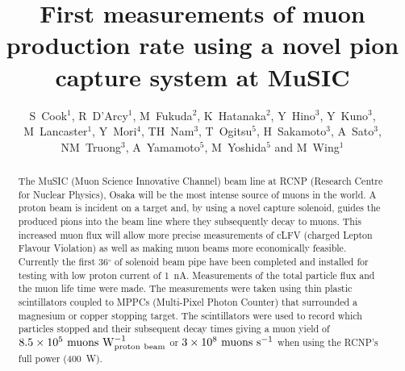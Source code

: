 \documentclass[a4paper]{jpconf}
\begin{document}
\title{First measurements of muon production rate using a novel pion capture system at MuSIC}

\author{S~Cook$^1$, R~D'Arcy$^1$, M~Fukuda$^2$, K~Hatanaka$^2$, Y~Hino$^3$, Y~Kuno$^3$, M~Lancaster$^1$, Y~Mori$^4$, TH~Nam$^3$, T~Ogitsu$^5$, H~Sakamoto$^3$, A~Sato$^3$, NM~Truong$^3$, A~Yamamoto$^5$, M~Yoshida$^5$ and M~Wing$^1$}

\address{$^1$Department of Physics and Astronomy, University College London, Gower Street, London WC1E~6BT, UK}
\address{$^2$Research Centre for Nuclear Physics, 10-1 Mihogaoka, Ibaraki, Osaka~567-0047, Japan}
\address{$^3$Department of Physics, Graduate School of Science, Osaka University, 1-1 Machikane, Toyonaka, Osaka 590-0043 Japan}
\address{$^4$Kyoto Research Reactor Institute, 2 Asashiro-Nishi, Kumatori-cho, Sennangu, Osaka 590-0494, Japan}
\address{$^5$High Energy Accelerator Research Organisation, KEK, 1-1 Oho, Tsukuba, Ibaragi 305-0801, Japan}


\begin{abstract}
The MuSIC (Muon Science Innovative Channel) beam line at RCNP (Research Centre for Nuclear Physics), Osaka will be the most intense source of muons in the world. A proton beam is incident on a target and, by using a novel capture solenoid, guides the produced pions into the beam line where they subsequently decay to muons. This increased muon flux will allow more precise measurements of cLFV (charged Lepton Flavour Violation) as well as making muon beams more economically feasible. Currently the first 36$^{\circ}$ of solenoid beam pipe have been completed and installed for testing with low proton current of 1~nA. Measurements of the total particle flux and the muon life time were made. The measurements were taken using thin plastic scintillators coupled to MPPCs (Multi-Pixel Photon Counter) that surrounded a magnesium or copper stopping target. The scintillators were used to record which particles stopped and their subsequent decay times giving a muon yield of $8.5\times 10^5 \rm{~muons} \rm{~W}^{-1}_{\rm{proton~beam}}$ or $3\times 10^8 \rm{~muons} \rm{~s}^{-1}$ when using the RCNP's full power (400~W).
\\
\\ 

\end{abstract}    
\end{document}
